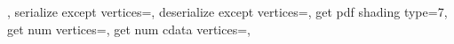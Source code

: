 {{		\pgfpathcurveto	{\expandafter\pgfplotspointpatchvertex\pgfplotspatchclass@tensor@E\endvertex}%
						{\expandafter\pgfplotspointpatchvertex\pgfplotspatchclass@tensor@F\endvertex}%
						{\expandafter\pgfplotspointpatchvertex\pgfplotspatchclass@tensor@G\endvertex}%
		\pgfpathcurveto	{\expandafter\pgfplotspointpatchvertex\pgfplotspatchclass@tensor@H\endvertex}%
						{\expandafter\pgfplotspointpatchvertex\pgfplotspatchclass@tensor@I\endvertex}%
						{\expandafter\pgfplotspointpatchvertex\pgfplotspatchclass@tensor@J\endvertex}%
		\pgfpathcurveto	{\expandafter\pgfplotspointpatchvertex\pgfplotspatchclass@tensor@K\endvertex}%
						{\expandafter\pgfplotspointpatchvertex\pgfplotspatchclass@tensor@L\endvertex}%
						{\expandafter\pgfplotspointpatchvertex\pgfplotspatchclass@tensor@A\endvertex}%
		\pgfpathclose
	},
	serialize except vertices=\let\pgfplotsretval\pgfutil@empty,%
	deserialize except vertices=,
	get pdf shading type=7,
	get num vertices=\def\pgfplotsretval{16},
	get num cdata vertices=\def\pgfplotsretval{4},
}%

